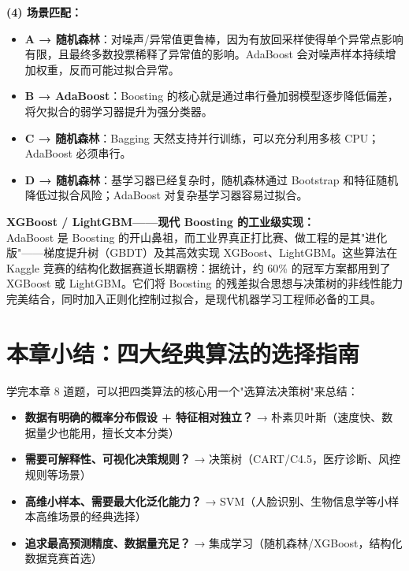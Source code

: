 \documentclass[a4paper,11pt]{ctexart}
\begin{document}
\begin{solutionbox}[参考答案与详细解析]
    \textbf{(4) 场景匹配：}
    \begin{itemize}
        \item \textbf{A → 随机森林}：对噪声/异常值更鲁棒，因为有放回采样使得单个异常点影响有限，且最终多数投票稀释了异常值的影响。AdaBoost 会对噪声样本持续增加权重，反而可能过拟合异常。
        \item \textbf{B → AdaBoost}：Boosting 的核心就是通过串行叠加弱模型逐步降低偏差，将欠拟合的弱学习器提升为强分类器。
        \item \textbf{C → 随机森林}：Bagging 天然支持并行训练，可以充分利用多核 CPU；AdaBoost 必须串行。
        \item \textbf{D → 随机森林}：基学习器已经复杂时，随机森林通过 Bootstrap 和特征随机降低过拟合风险；AdaBoost 对复杂基学习器容易过拟合。
    \end{itemize}
\end{solutionbox}

\begin{appbox}[现实应用场景]
    \textbf{XGBoost / LightGBM——现代 Boosting 的工业级实现：}\\
    AdaBoost 是 Boosting 的开山鼻祖，而工业界真正打比赛、做工程的是其"进化版"——梯度提升树（GBDT）及其高效实现 XGBoost、LightGBM。这些算法在 Kaggle 竞赛的结构化数据赛道长期霸榜：据统计，约 60\% 的冠军方案都用到了 XGBoost 或 LightGBM。它们将 Boosting 的残差拟合思想与决策树的非线性能力完美结合，同时加入正则化控制过拟合，是现代机器学习工程师必备的工具。
\end{appbox}


\section{本章小结：四大经典算法的选择指南}

学完本章 8 道题，可以把四类算法的核心用一个"选算法决策树"来总结：

\begin{itemize}
    \item \textbf{数据有明确的概率分布假设 + 特征相对独立？} → 朴素贝叶斯（速度快、数据量少也能用，擅长文本分类）
    \item \textbf{需要可解释性、可视化决策规则？} → 决策树（CART/C4.5，医疗诊断、风控规则等场景）
    \item \textbf{高维小样本、需要最大化泛化能力？} → SVM（人脸识别、生物信息学等小样本高维场景的经典选择）
    \item \textbf{追求最高预测精度、数据量充足？} → 集成学习（随机森林/XGBoost，结构化数据竞赛首选）
\end{itemize}
\end{document}
